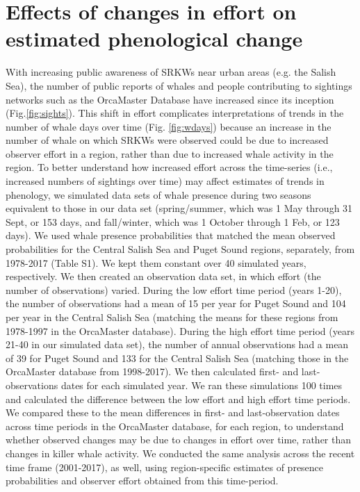 \documentclass{article}
\begin{document}
\section* {Effects of changes in effort on estimated phenological change}
With increasing public awareness of SRKWs near urban areas (e.g. the Salish Sea), the number of public reports of whales and people contributing to sightings networks such as the OrcaMaster Database have increased since its inception (Fig.\ref{fig:sights}). This shift in effort complicates interpretations of trends in the number of whale days over time (Fig. \ref{fig:wdays}) because an increase in the number of whale on which SRKWs were observed could be due to increased observer effort in a region, rather than due to increased whale activity in the region. To better understand how increased effort across the time-series (i.e., increased numbers of sightings over time) may affect estimates of trends in phenology, we simulated data sets of whale presence during two seasons equivalent to those in our data set (spring/summer, which was 1 May through 31 Sept, or 153 days, and fall/winter, which was 1 October through 1 Feb, or 123 days). We used whale presence probabilities that matched the mean observed probabilities for the Central Salish Sea and Puget Sound regions, separately, from 1978-2017 (Table S1). We kept them constant over 40 simulated years, respectively. We then created an observation data set, in which effort (the number of observations) varied. During the low effort time period (years 1-20), the number of observations had a mean of 15 per year for Puget Sound and 104 per year in the Central Salish Sea (matching the means for these regions from 1978-1997 in the OrcaMaster database). During the high effort time period (years 21-40 in our simulated data set), the number of annual observations had a mean of 39 for Puget Sound and 133 for the Central Salish Sea (matching those in the OrcaMaster database from 1998-2017). We then calculated first- and last- observations dates for each simulated year. We ran these simulations 100 times and calculated the difference between the low effort and high effort time periods. We compared these to the mean differences in first- and last-observation dates across time periods in the OrcaMaster database, for each region, to understand whether observed changes may be due to changes in effort over time, rather than changes in killer whale activity. We conducted the same analysis across the recent time frame (2001-2017), as well, using region-specific estimates of presence probabilities and observer effort obtained from this time-period.
\end{document}
